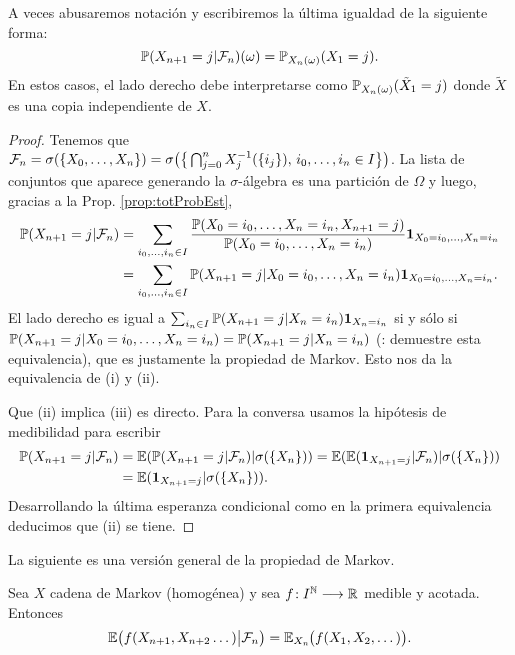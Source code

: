 \begin{rem}\label{rem:abusonot}
A veces abusaremos notación y escribiremos la última igualdad de la siguiente forma:
\[\mathbb{P}(X_{n+1}=j|\mathcal{F}_n)(\omega)=\mathbb{P}_{X_n(\omega)}(X_1=j).\]
En estos casos, el lado derecho debe interpretarse como $\mathbb{P}_{X_n(\omega)}(\tilde X_1=j)$ donde $\tilde X$ es una copia independiente de $X$.
\end{rem}

\begin{proof}
Tenemos que $\mathcal{F}_n=\sigma(\{X_0,\dotsc,X_n\})=\sigma\big(\big\{\bigcap_{j=0}^nX_j^{-1}(\{i_j\}),\,i_0,\dotsc,i_n\in I\big\}\big)$.
La lista de conjuntos que aparece generando la $\sigma$-álgebra es una partición de $\Omega$ y luego, gracias a la Prop. \ref{prop:totProbEst},
\begin{align}
\mathbb{P}(X_{n+1}=j|\mathcal{F}_n)&=\sum_{i_0,\dotsc,i_n\in I}\frac{\mathbb{P}(X_0=i_0,\dotsc,X_n=i_n,X_{n+1}=j)}{\mathbb{P}(X_0=i_0,\dotsc,X_n=i_n)}\mathbf{1}_{X_0=i_0,\dotsc,X_n=i_n}\\
&=\sum_{i_0,\dotsc,i_n\in I}\mathbb{P}(X_{n+1}=j|X_0=i_0,\dotsc,X_n=i_n)\mathbf{1}_{X_0=i_0,\dotsc,X_n=i_n}.
\end{align}
El lado derecho es igual a $\sum_{i_n\in I}\mathbb{P}(X_{n+1}=j|X_n=i_n)\mathbf{1}_{X_n=i_n}$ si y sólo si $\mathbb{P}(X_{n+1}=j|X_0=i_0,\dotsc,X_n=i_n)=\mathbb{P}(X_{n+1}=j|X_n=i_n)$ (\uexers: demuestre esta equivalencia), que es justamente la propiedad de Markov.
Esto nos da la equivalencia de (i) y (ii).

Que (ii) implica (iii) es directo.
Para la conversa usamos la hipótesis de medibilidad para escribir
\begin{align}
\mathbb{P}(X_{n+1}=j|\mathcal{F}_n)&=\mathbb{E}(\mathbb{P}(X_{n+1}=j|\mathcal{F}_n)|\sigma(\{X_n\}))=\mathbb{E}(\mathbb{E}(\mathbf{1}_{X_{n+1}=j}|\mathcal{F}_n)|\sigma(\{X_n\}))\\
&=\mathbb{E}(\mathbf{1}_{X_{n+1}=j}|\sigma(\{X_n\})).
\end{align}
Desarrollando la última esperanza condicional como en la primera equivalencia deducimos que (ii) se tiene.
\end{proof}

La siguiente es una versión general de la propiedad de Markov.

\begin{thm}\label{thm:propMarkGen}
Sea $X$ cadena de Markov (homogénea) y sea $f\!:I^{\mathbb{N}}\longrightarrow\mathbb{R}$ medible y acotada.
Entonces
\[\mathbb{E}\big(f(X_{n+1},X_{n+2}\dotsc)\big|\mathcal{F}_n\big)=\mathbb{E}_{X_n}\hspace{-0.1em}\big(f(X_1,X_2,\dotsc)\big).\]
\end{thm}

